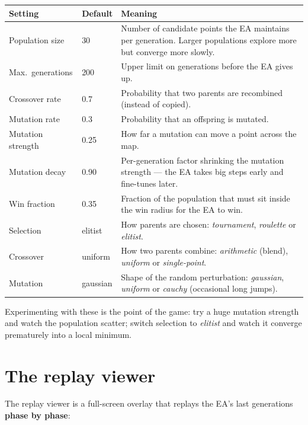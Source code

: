 \documentclass[11pt,a4paper]{report}
\begin{document}
\begin{center}
\begin{tabularx}{\textwidth}{l l X}
  \toprule
  \textbf{Setting} & \textbf{Default} & \textbf{Meaning} \\
  \midrule
  Population size & 30 &
    Number of candidate points the EA maintains per generation. Larger
    populations explore more but converge more slowly. \\
  Max.\ generations & 200 &
    Upper limit on generations before the EA gives up. \\
  Crossover rate & 0.7 &
    Probability that two parents are recombined (instead of copied). \\
  Mutation rate & 0.3 &
    Probability that an offspring is mutated. \\
  Mutation strength & 0.25 &
    How far a mutation can move a point across the map. \\
  Mutation decay & 0.90 &
    Per-generation factor shrinking the mutation strength --- the EA takes
    big steps early and fine-tunes later. \\
  Win fraction & 0.35 &
    Fraction of the population that must sit inside the win radius for the
    EA to win. \\
  Selection & elitist &
    How parents are chosen: \emph{tournament}, \emph{roulette} or
    \emph{elitist}. \\
  Crossover & uniform &
    How two parents combine: \emph{arithmetic} (blend), \emph{uniform} or
    \emph{single-point}. \\
  Mutation & gaussian &
    Shape of the random perturbation: \emph{gaussian}, \emph{uniform} or
    \emph{cauchy} (occasional long jumps). \\
  \bottomrule
\end{tabularx}
\end{center}

Experimenting with these is the point of the game: try a huge mutation
strength and watch the population scatter; switch selection to
\emph{elitist} and watch it converge prematurely into a local minimum.

\section{The replay viewer}
\label{sec:replay}

The replay viewer is a full-screen overlay that replays the EA's last
generations \textbf{phase by phase}:
\end{document}
